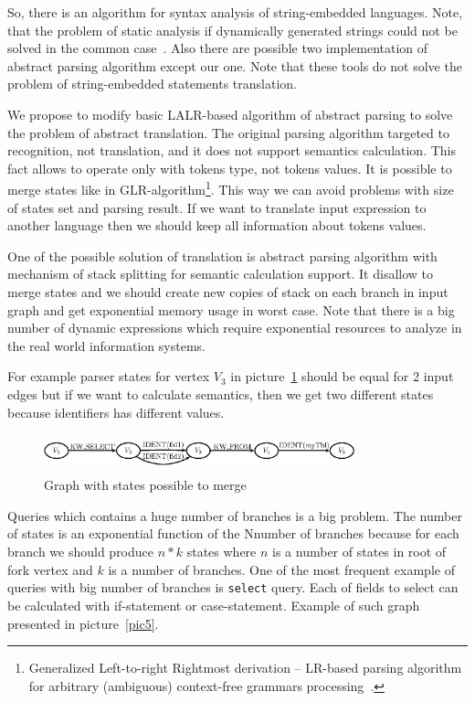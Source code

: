 So, there is an algorithm for syntax analysis of string-embedded languages. Note, that the problem of static 
analysis if dynamically generated strings could not be solved in the common case~\cite{ALVOR2}. Also there are 
possible two implementation of abstract parsing algorithm except our one. Note that these tools do not solve 
the problem of string-embedded statements translation.

We propose to modify basic LALR-based algorithm of abstract parsing to solve the problem of abstract 
translation. The original parsing algorithm targeted to recognition, not translation, and it does not 
support semantics calculation. This fact allows to operate only with tokens type, not tokens values. 
It is possible to merge states like in GLR-algorithm\footnote{Generalized Left-to-right Rightmost 
derivation -- LR-based parsing algorithm for arbitrary (ambiguous) context-free grammars 
processing~\cite{Grune}.}. This way we can avoid problems with size of states set and parsing result.
If we want to translate input expression to another language then we should keep all information 
about tokens values. 

One of the possible solution of translation is abstract parsing algorithm with mechanism of stack 
splitting for semantic calculation support. It disallow to merge states and we should create new 
copies of stack on each branch in input graph and get exponential memory usage in worst case. 
Note that there is a big number of dynamic expressions which require exponential resources to 
analyze in the real world information systems. 

For example parser states for vertex $V_3$ in picture~\ref{pic4} should be equal for 2 input edges
but if we want to calculate semantics, then we get two different states because identifiers has 
different values.

\begin{figure}
    \begin{center}
        \includegraphics[width=9cm,height=1.1cm]{graphs/states_example.eps}
        \caption{Graph with states possible to merge}
        \label{pic4}
    \end{center}
\end{figure}

Queries which contains a huge number of branches is a big problem. The number of states is an 
exponential function of the Nnumber of branches because for each branch we should produce $n*k$ 
states where $n$ is a number of states in root of fork vertex and $k$ is a number of branches. 
One of the most frequent example of queries with big number of branches is \verb|select| query. 
Each of fields to select can be calculated with if-statement or case-statement. Example of such 
graph presented in picture~\ref{pic5}.


